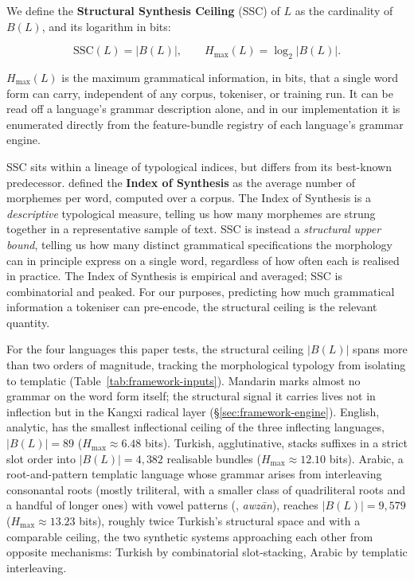 We define the \textbf{Structural Synthesis Ceiling} (SSC) of $L$ as the cardinality of $B(L)$, and its logarithm in bits:

\begin{equation}
\mathrm{SSC}(L) = |B(L)|, \qquad H_{\max}(L) = \log_2 |B(L)|.
\label{eq:ssc}
\end{equation}

$H_{\max}(L)$ is the maximum grammatical information, in bits, that a single word form can carry, independent of any corpus, tokeniser, or training run. It can be read off a language's grammar description alone, and in our implementation it is enumerated directly from the feature-bundle registry of each language's grammar engine.

SSC sits within a lineage of typological indices, but differs from its best-known predecessor. \citet{greenberg1960} defined the \textbf{Index of Synthesis} as the average number of morphemes per word, computed over a corpus. The Index of Synthesis is a \emph{descriptive} typological measure, telling us how many morphemes are strung together in a representative sample of text. SSC is instead a \emph{structural upper bound}, telling us how many distinct grammatical specifications the morphology can in principle express on a single word, regardless of how often each is realised in practice. The Index of Synthesis is empirical and averaged; SSC is combinatorial and peaked. For our purposes, predicting how much grammatical information a tokeniser can pre-encode, the structural ceiling is the relevant quantity.

For the four languages this paper tests, the structural ceiling $|B(L)|$ spans more than two orders of magnitude, tracking the morphological typology from isolating to templatic (Table~\ref{tab:framework-inputs}). Mandarin marks almost no grammar on the word form itself; the structural signal it carries lives not in inflection but in the Kangxi radical layer (\S\ref{sec:framework-engine}). English, analytic, has the smallest inflectional ceiling of the three inflecting languages, $|B(L)| = 89$ ($H_{\max} \approx 6.48$ bits). Turkish, agglutinative, stacks suffixes in a strict slot order into $|B(L)| = 4{,}382$ realisable bundles ($H_{\max} \approx 12.10$ bits). Arabic, a root-and-pattern templatic language whose grammar arises from interleaving consonantal roots (mostly triliteral, with a smaller class of quadriliteral roots and a handful of longer ones) with vowel patterns (, \emph{awz\=an}), reaches $|B(L)| = 9{,}579$ ($H_{\max} \approx 13.23$ bits), roughly twice Turkish's structural space and with a comparable ceiling, the two synthetic systems approaching each other from opposite mechanisms: Turkish by combinatorial slot-stacking, Arabic by templatic interleaving.

